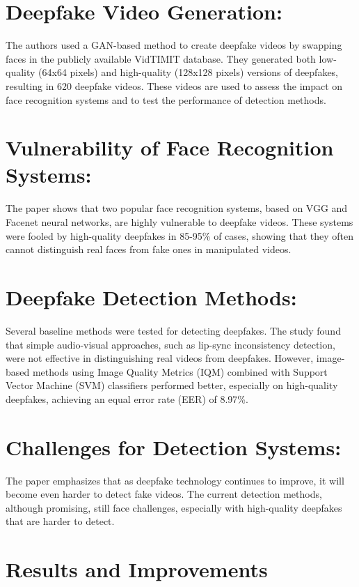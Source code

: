 \documentclass{report}
\begin{document}
	\section{Deepfake Video Generation:}
	The authors used a GAN-based method to create deepfake videos by swapping faces in the publicly available VidTIMIT database. They generated both low-quality (64x64 pixels) and high-quality (128x128 pixels) versions of deepfakes, resulting in 620 deepfake videos. These videos are used to assess the impact on face recognition systems and to test the performance of detection methods.
	
	
	
	\section{Vulnerability of Face Recognition Systems:}
	The paper shows that two popular face recognition systems, based on VGG and Facenet neural networks, are highly vulnerable to deepfake videos. These systems were fooled by high-quality deepfakes in 85-95\% of cases, showing that they often cannot distinguish real faces from fake ones in manipulated videos.
	
	
	\section{Deepfake Detection Methods:}
	Several baseline methods were tested for detecting deepfakes. The study found that simple audio-visual approaches, such as lip-sync inconsistency detection, were not effective in distinguishing real videos from deepfakes. However, image-based methods using Image Quality Metrics (IQM) combined with Support Vector Machine (SVM) classifiers performed better, especially on high-quality deepfakes, achieving an equal error rate (EER) of 8.97\%.
	
	
	\section{Challenges for Detection Systems:}
	The paper emphasizes that as deepfake technology continues to improve, it will become even harder to detect fake videos. The current detection methods, although promising, still face challenges, especially with high-quality deepfakes that are harder to detect.
	
	
	
	\section{Results and Improvements}
\end{document}
